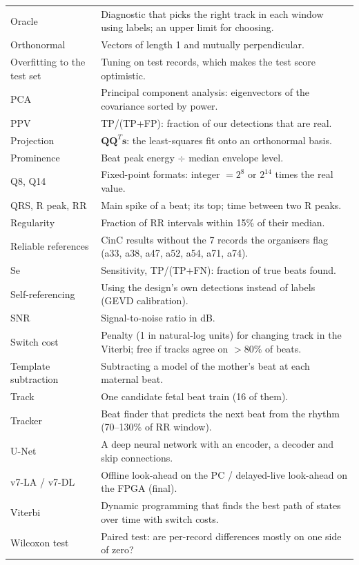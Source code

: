 \documentclass[11pt]{article}
\begin{document}
\begin{center}
\begin{longtable}{p{3.6cm}p{11.6cm}}
Oracle & Diagnostic that picks the right track in each window using labels; an upper limit for choosing. \\
Orthonormal & Vectors of length 1 and mutually perpendicular. \\
Overfitting to the test set & Tuning on test records, which makes the test score optimistic. \\
PCA & Principal component analysis: eigenvectors of the covariance sorted by power. \\
PPV & TP/(TP+FP): fraction of our detections that are real. \\
Projection & $\mathbf{Q}\mathbf{Q}^T\mathbf{s}$: the least-squares fit onto an orthonormal basis. \\
Prominence & Beat peak energy $\div$ median envelope level. \\
Q8, Q14 & Fixed-point formats: integer $= 2^8$ or $2^{14}$ times the real value. \\
QRS, R peak, RR & Main spike of a beat; its top; time between two R peaks. \\
Regularity & Fraction of RR intervals within 15\% of their median. \\
Reliable references & CinC results without the 7 records the organisers flag (a33, a38, a47, a52, a54, a71, a74). \\
Se & Sensitivity, TP/(TP+FN): fraction of true beats found. \\
Self-referencing & Using the design's own detections instead of labels (GEVD calibration). \\
SNR & Signal-to-noise ratio in dB. \\
Switch cost & Penalty (1 in natural-log units) for changing track in the Viterbi; free if tracks agree on $>80\%$ of beats. \\
Template subtraction & Subtracting a model of the mother's beat at each maternal beat. \\
Track & One candidate fetal beat train (16 of them). \\
Tracker & Beat finder that predicts the next beat from the rhythm (70--130\% of RR window). \\
U-Net & A deep neural network with an encoder, a decoder and skip connections. \\
v7-LA / v7-DL & Offline look-ahead on the PC / delayed-live look-ahead on the FPGA (final). \\
Viterbi & Dynamic programming that finds the best path of states over time with switch costs. \\
Wilcoxon test & Paired test: are per-record differences mostly on one side of zero? \\
\bottomrule
\end{longtable}
\end{center}
\end{document}
